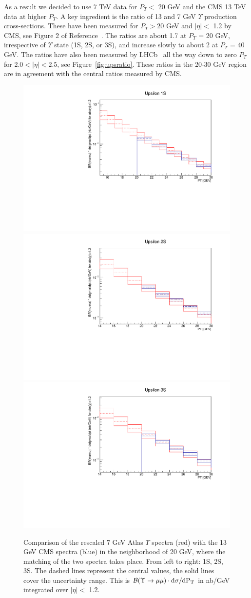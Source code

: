 \documentclass[12pt]{article}
\begin{document}
  
  As a result we decided to use 7 TeV data for $P_T <$ 20 GeV and the CMS
  13 TeV data at higher $P_T$.  A key ingredient is the ratio of 13 and 7
  GeV $\Upsilon$ production cross-sections.  These have been measured
  for $P_T > 20$ GeV and $|\eta| <$ 1.2 by CMS,
  see Figure 2 of Reference~\cite{Sirunyan:2017qdw}. The ratios
  are about 1.7 at $P_T$ = 20 GeV, irrespective of $\Upsilon$ state
  (1S, 2S, or 3S), and increase slowly to about 2
  at $P_T$ = 40 GeV.  The ratios have also been measured by
  LHCb~\cite{Aaij:2018pfp}
  all the way down to zero $P_T$ for $2.0 < |\eta| < 2.5$, see Figure~\ref{fig:upsratio}.
  These ratios in the 20-30 GeV region are in agreement with the central
  ratios measured by CMS.

\begin{figure}
\begin{adjustwidth}{-3cm}{-3cm}
\centering
\includegraphics[width=0.32\linewidth]{../oniaDirect/upsilon/upsilon-1s-atlas-cms-comparison.pdf}
\includegraphics[width=0.32\linewidth]{../oniaDirect/upsilon/upsilon-2s-atlas-cms-comparison.pdf}
\includegraphics[width=0.32\linewidth]{../oniaDirect/upsilon/upsilon-3s-atlas-cms-comparison.pdf}
\end{adjustwidth}
\caption{\protect Comparison of the rescaled 7 GeV Atlas $\Upsilon$ spectra (red) with the
  13 GeV CMS spectra (blue) in the neighborhood of 20 GeV, where the matching of
  the two spectra takes place.  From left to right: 1S, 2S, 3S.
  The dashed lines represent the central values, the solid
  lines cover the uncertainty range.  This is ${\cal B}(\Upsilon \to \mu\mu) \cdot
  \rm{d}\sigma/\rm{d}P_T$ in nb/GeV integrated
  over $|\eta| <$ 1.2.}
\label{fig:checkMatch}
\end{figure}
\end{document}
